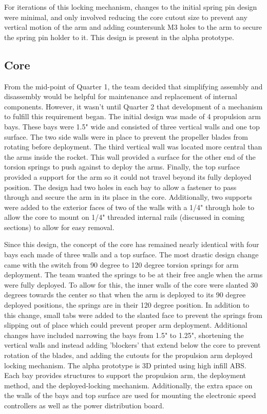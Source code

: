 For iterations of this locking mechanism, changes to the initial spring pin design were minimal, and only involved reducing the core cutout size to prevent any vertical motion of the arm and adding countersunk M3 holes to the arm to secure the spring pin holder to it. This design is present in the alpha prototype. 

\subsection{Core}
From the mid-point of Quarter 1, the team decided that simplifying assembly and disassembly would be helpful for maintenance and replacement of internal components. However, it wasn't until Quarter 2 that development of a mechanism to fulfill this requirement began. The initial design was made of 4 propulsion arm bays. These bays were 1.5" wide and consisted of three vertical walls and one top surface. The two side walls were in place to prevent the propeller blades from rotating before deployment. The third vertical wall was located more central than the arms inside the rocket. This wall provided a surface for the other end of the torsion springs to push against to deploy the arms. Finally, the top surface provided a support for the arm so it could not travel beyond its fully deployed position. The design had two holes in each bay to allow a fastener to pass through and secure the arm in its place in the core. Additionally, two supports were added to the exterior faces of two of the walls with a 1/4" through hole to allow the core to mount on 1/4" threaded internal rails (discussed in coming sections) to allow for easy removal.

Since this design, the concept of the core has remained nearly identical with four bays each made of three walls and a top surface. The most drastic design change came with the switch from 90 degree to 120 degree torsion springs for arm deployment. The team wanted the springs to be at their free angle when the arms were fully deployed. To allow for this, the inner walls of the core were slanted 30 degrees towards the center so that when the arm is deployed to its 90 degree deployed positions, the springs are in their 120 degree position. In addition to this change, small tabs were added to the slanted face to prevent the springs from slipping out of place which could prevent proper arm deployment. Additional changes have included narrowing the bays from 1.5" to 1.25", shortening the vertical walls and instead adding 'blockers' that extend below the core to prevent rotation of the blades, and adding the cutouts for the propulsion arm deployed locking mechanism. The alpha prototype is 3D printed using high infill ABS. Each bay provides structures to support the propulsion arm, the deployment method, and the deployed-locking mechanism. Additionally, the extra space on the walls of the bays and top surface are used for mounting the electronic speed controllers as well as the power distribution board.

